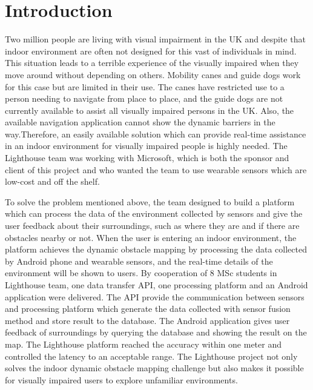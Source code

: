 \documentclass[prodmode,acmtosem]{acmsmall} %
\begin{document}



\maketitle

\section{Introduction}

Two million people are living with visual impairment in the UK and despite that indoor environment are often not designed for this vast of individuals in mind.\cite{NHSBlindStatistics} This situation leads to a terrible experience of the visually impaired when they move around without depending on others. Mobility canes and guide dogs work for this case but are limited in their use. The canes have restricted use to a person needing to navigate from place to place, and the guide dogs are not currently available to assist all visually impaired persons in the UK. Also, the available navigation application cannot show the dynamic barriers in the way.Therefore, an easily available solution which can provide real-time assistance in an indoor environment for visually impaired people is highly needed. The Lighthouse team was working with Microsoft, which is both the sponsor and client of this project and who wanted the team to use wearable sensors which are low-cost and off the shelf.

To solve the problem mentioned above, the team designed to build a platform which can process the data of the environment collected by sensors and give the user feedback about their surroundings, such as where they are and if there are obstacles nearby or not. When the user is entering an indoor environment, the platform achieves the dynamic obstacle mapping by processing the data collected by Android phone and wearable sensors, and the real-time details of the environment will be shown to users.
By cooperation of 8 MSc students in Lighthouse team, one data transfer API, one processing platform and an Android application were delivered. The API provide the communication between sensors and processing platform which generate the data collected with sensor fusion method and store result to the database. The Android application gives user feedback of surroundings by querying the database and showing the result on the map.
The Lighthouse platform reached the accuracy within one meter and controlled the latency to an acceptable range. The Lighthouse project not only solves the indoor dynamic obstacle mapping challenge but also makes it possible for visually impaired users to explore unfamiliar environments.
\end{document}
